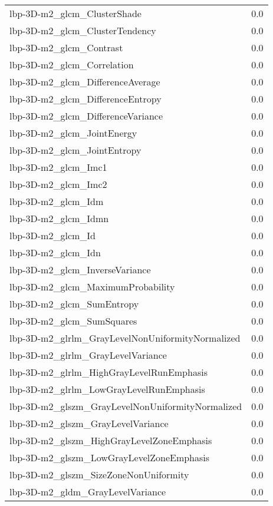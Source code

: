 {\begin{xltabular}[H]{\textwidth}{X r}
        lbp-3D-m2\_glcm\_ClusterShade & 0.0 \\
        lbp-3D-m2\_glcm\_ClusterTendency & 0.0 \\
        lbp-3D-m2\_glcm\_Contrast & 0.0 \\
        lbp-3D-m2\_glcm\_Correlation & 0.0 \\
        lbp-3D-m2\_glcm\_DifferenceAverage & 0.0 \\
        lbp-3D-m2\_glcm\_DifferenceEntropy & 0.0 \\
        lbp-3D-m2\_glcm\_DifferenceVariance & 0.0 \\
        lbp-3D-m2\_glcm\_JointEnergy & 0.0 \\
        lbp-3D-m2\_glcm\_JointEntropy & 0.0 \\
        lbp-3D-m2\_glcm\_Imc1 & 0.0 \\
        lbp-3D-m2\_glcm\_Imc2 & 0.0 \\
        lbp-3D-m2\_glcm\_Idm & 0.0 \\
        lbp-3D-m2\_glcm\_Idmn & 0.0 \\
        lbp-3D-m2\_glcm\_Id & 0.0 \\
        lbp-3D-m2\_glcm\_Idn & 0.0 \\
        lbp-3D-m2\_glcm\_InverseVariance & 0.0 \\
        lbp-3D-m2\_glcm\_MaximumProbability & 0.0 \\
        lbp-3D-m2\_glcm\_SumEntropy & 0.0 \\
        lbp-3D-m2\_glcm\_SumSquares & 0.0 \\
        lbp-3D-m2\_glrlm\_GrayLevelNonUniformityNormalized & 0.0 \\
        lbp-3D-m2\_glrlm\_GrayLevelVariance & 0.0 \\
        lbp-3D-m2\_glrlm\_HighGrayLevelRunEmphasis & 0.0 \\
        lbp-3D-m2\_glrlm\_LowGrayLevelRunEmphasis & 0.0 \\
        lbp-3D-m2\_glszm\_GrayLevelNonUniformityNormalized & 0.0 \\
        lbp-3D-m2\_glszm\_GrayLevelVariance & 0.0 \\
        lbp-3D-m2\_glszm\_HighGrayLevelZoneEmphasis & 0.0 \\
        lbp-3D-m2\_glszm\_LowGrayLevelZoneEmphasis & 0.0 \\
        lbp-3D-m2\_glszm\_SizeZoneNonUniformity & 0.0 \\
        lbp-3D-m2\_gldm\_GrayLevelVariance & 0.0 \\

\end{xltabular}}
